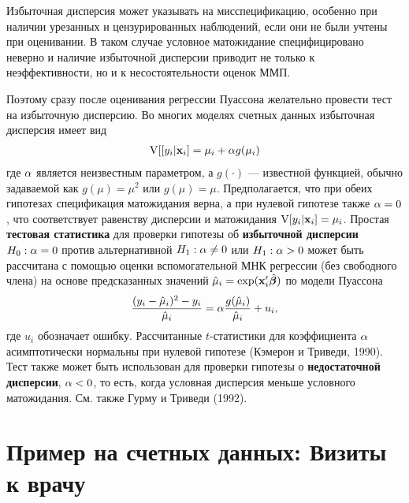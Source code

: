 Избыточная дисперсия может указывать на мисспецификацию, особенно при наличии урезанных и цензурированных наблюдений, если они не были учтены при оценивании. В таком случае условное матожидание специфицировано неверно и наличие избыточной дисперсии приводит не только к неэффективности, но и к несостоятельности оценок ММП.

Поэтому сразу после оценивания регрессии Пуассона желательно провести тест на избыточную дисперсию. Во многих моделях счетных данных избыточная дисперсия имеет вид
    \begin{align}\label{eq:20.9}
    \mathrm{V}[[y_i|\mathbf{x}_i] = \mu_i + \alpha g(\mu_i)
    \end{align}
где $\alpha$ является неизвестным параметром, а $g(\cdot)$ --- известной функцией, обычно задаваемой как $g(\mu) = \mu^2$ или $g(\mu) =\mu$. Предполагается, что при обеих гипотезах спецификация матожидания верна, а при нулевой гипотезе также $\alpha = 0$, что соответствует равенству дисперсии и матожидания $\mathrm{V}[y_i|\mathbf{x}_i] = \mu_i$.
Простая \textbf{тестовая статистика} для проверки гипотезы об \textbf{избыточной дисперсии} $H_0: \alpha = 0$ против альтернативной $H_1: \alpha \ne 0$ или $H_1: \alpha > 0$ может быть рассчитана с помощью оценки вспомогательной МНК регрессии (без свободного члена) на основе предсказанных значений $\hat{\mu}_i = \exp(\mathbf{x}'_i\hat{\bm{\beta}})$ по модели Пуассона
    \begin{align}\label{eq:20.10}
    \frac{(y_i - \hat{\mu}_i)^2 - y_i}{\hat{\mu}_i} = \alpha\frac{g(\hat{\mu}_i)}{\hat{\mu}_i} + u_i,
    \end{align}
где $u_i$ обозначает ошибку. Рассчитанные $t$-статистики для коэффициента $\alpha$ асимптотически нормальны при нулевой гипотезе (Кэмерон и Триведи, 1990). Тест также может быть использован для проверки гипотезы о \textbf{недостаточной дисперсии}, $\alpha < 0$, то есть, когда условная дисперсия меньше условного матожидания. См. также Гурму и Триведи (1992).




\section{Пример на счетных данных: Визиты к врачу}\label{sec:20.3}

